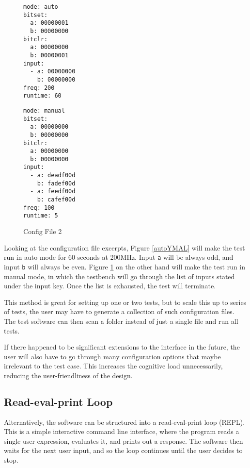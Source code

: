 \begin{figure}[H]
  \centering
  \begin{minipage}[b]{.35\linewidth}
  \begin{verbatim}
mode: auto
bitset:
  a: 00000001
  b: 00000000
bitclr:
  a: 00000000
  b: 00000001
input:
  - a: 00000000
    b: 00000000
freq: 200
runtime: 60
  \end{verbatim}
  \caption{Config File 1}
  \label{autoYMAL}
  \end{minipage}%
  \begin{minipage}[b]{.35\linewidth}
  \begin{verbatim}
mode: manual
bitset:
  a: 00000000
  b: 00000000
bitclr:
  a: 00000000
  b: 00000000
input:
  - a: deadf00d
    b: fadef00d
  - a: feedf00d
    b: cafef00d
freq: 100
runtime: 5
  \end{verbatim}
  \caption{Config File 2}
  \label{manYMAL}
  \end{minipage}
\end{figure}

Looking at the configuration file excerpts, Figure \ref{autoYMAL} will make the test run in auto mode for 60 seconds at 200MHz.
Input \texttt{a} will be always odd, and input \texttt{b} will always be even.
Figure \ref{manYMAL} on the other hand will make the test run in manual mode, in which the testbench will go through the list of inputs stated under the input key.
Once the list is exhausted, the test will terminate.

This method is great for setting up one or two tests, but to scale this up to series of tests, the user may have to generate a collection of such configuration files.
The test software can then scan a folder instead of just a single file and run all tests.

If there happened to be significant extensions to the interface in the future, the user will also have to go through many configuration options that maybe irrelevant to the test case.
This increases the cognitive load unnecessarily, reducing the user-friendliness of the design.

\subsection{Read-eval-print Loop}

Alternatively, the software can be structured into a read-eval-print loop (REPL).
This is a simple interactive command line interface, where the program reads a single user expression, evaluates it, and prints out a response.
The software then waits for the next user input, and so the loop continues until the user decides to stop.

